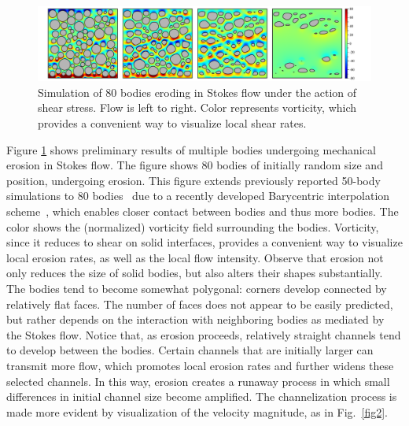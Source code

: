 \documentclass[11pt]{article}
\begin{document}

\begin{figure}%
\begin{center}
\includegraphics[width = 0.99 \textwidth]{./figs/80circ8vort.pdf}
\caption{\label{fig1} Simulation of 80 bodies eroding in Stokes flow under the action of shear stress. Flow is left to right. Color represents vorticity, which provides a convenient way to visualize local shear rates. 
}
\end{center}
\end{figure}
 
 Figure \ref{fig1} shows preliminary results of multiple bodies undergoing mechanical erosion in Stokes flow. The figure shows 80 bodies of initially random size and position, undergoing erosion. This figure extends previously reported 50-body simulations to 80 bodies~\cite{Quaife2018} due to a recently developed Barycentric interpolation scheme~\cite{bar2014, bar-wu-vee2015}, which enables closer contact between bodies and thus more bodies.
The color shows the (normalized) vorticity field surrounding the bodies. Vorticity, since it reduces to shear on solid interfaces, provides a convenient way to visualize local erosion rates, as well as the local flow intensity. Observe that erosion not only reduces the size of solid bodies, but also alters their shapes substantially. The bodies tend to become somewhat polygonal: corners develop connected by relatively flat faces. The number of faces does not appear to be easily predicted, but rather depends on the interaction with neighboring bodies as mediated by the Stokes flow. Notice that, as erosion proceeds, relatively straight channels tend to develop between the bodies. Certain channels that are initially larger can transmit more flow, which promotes local erosion rates and further widens these selected channels. In this way, erosion creates a runaway process in which small differences in initial channel size become amplified. The channelization process is made more evident by visualization of the velocity magnitude, as in Fig.~\ref{fig2}.
\end{document}
